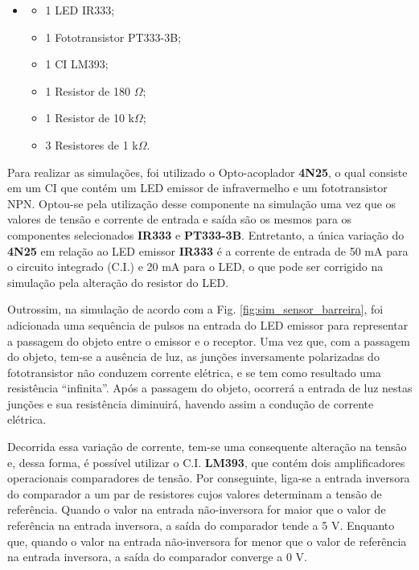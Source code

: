     \begin{itemize}
    \item[ ]
        \begin{itemize}
            \item 1 LED IR333;
            \item 1 Fototransistor PT333-3B;
            \item 1 CI LM393;
            \item 1 Resistor de 180 $\Omega$;
            \item 1 Resistor de 10 k$\Omega$;
            \item 3 Resistores de 1 k$\Omega$.
        \end{itemize}
    \end{itemize}
    
    Para realizar as simulações, foi utilizado o Opto-acoplador \textbf{4N25}, o qual consiste em um CI que contém um LED emissor de infravermelho e um fototransistor NPN. Optou-se pela utilização desse componente na simulação uma vez que os valores de tensão e corrente de entrada e saída são os mesmos para os componentes selecionados \textbf{IR333} e \textbf{PT333-3B}. Entretanto, a única variação do \textbf{4N25} em relação ao LED emissor \textbf{IR333} é a corrente de entrada de 50 mA para o circuito integrado (C.I.) e 20 mA para o LED, o que pode ser corrigido na simulação pela alteração do resistor do LED.
    
    Outrossim, na simulação de acordo com a Fig. \ref{fig:sim_sensor_barreira}, foi adicionada uma sequência de pulsos na entrada do LED emissor para representar a passagem do objeto entre o emissor e o receptor. Uma vez que, com a passagem do objeto, tem-se a ausência de luz, as junções inversamente polarizadas do fototransistor não conduzem corrente elétrica, e se tem como resultado uma resistência ``infinita''. Após a passagem do objeto, ocorrerá a entrada de luz nestas junções e sua resistência diminuirá, havendo assim a condução de corrente elétrica. 
    
    Decorrida essa variação de corrente, tem-se uma consequente alteração na tensão e, dessa forma, é possível utilizar o C.I. \textbf{LM393}, que contém dois amplificadores operacionais comparadores de tensão. Por conseguinte, liga-se a entrada inversora do comparador a um par de resistores cujos valores determinam a tensão de referência. Quando o valor na entrada não-inversora for maior que o valor de referência na entrada inversora, a saída do comparador tende a 5 V. Enquanto que, quando o valor na entrada não-inversora for menor que o valor de referência na entrada inversora, a saída do comparador converge a 0 V. 
    
